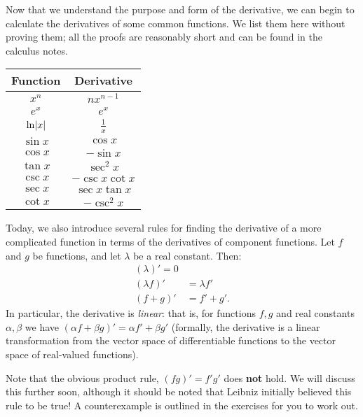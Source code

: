 


Now that we understand the purpose and form of the derivative, we can begin to calculate
the derivatives of some common functions. We list them here without proving them; all the
proofs are reasonably short and can be found in the calculus notes.

\begin{center}
  \def\arraystretch{1.5}
  \begin{tabular}{c|c}
    \textbf{Function} & \textbf{Derivative}\\\hline
    $ x^n $ & $ nx^{n - 1} $\\
    $ e^x $ & $ e^x $\\
    $ \ln \abs{x} $ & $ \frac{1}{x} $\\
    $ \sin x $ & $ \cos x $\\
    $ \cos x $ & $ -\sin x $\\
    $ \tan x $ & $ \sec^2 x $\\
    $ \csc x $ & $ -\csc x \cot x $\\
    $ \sec x $ & $ \sec x \tan x $\\
    $ \cot x $ & $ -\csc^2 x $
  \end{tabular}
\end{center}

Today, we also introduce several rules for finding the derivative of a more complicated function
in terms of the derivatives of component functions. Let $ f $ and $ g $ be functions, and let $ \lambda $ be a real constant. Then:
\begin{align*}
  (\lambda)' = 0\\
  (\lambda f)' &= \lambda f'\\
  (f + g)' &= f' + g'.
\end{align*}
In particular, the derivative is \textit{linear}: that is, for functions $ f, g $ and real constants $ \alpha, \beta $
we have $ (\alpha f + \beta g)' = \alpha f' + \beta g' $ (formally, the derivative is a linear transformation from the
vector space of differentiable functions to the vector space of real-valued functions).

Note that the obvious product rule, $ (fg)' = f'g' $ does \textbf{not} hold. We will discuss this further soon,
although it should be noted that Leibniz initially believed this rule to be true! A counterexample is outlined in the
exercises for you to work out.

\clearpage
